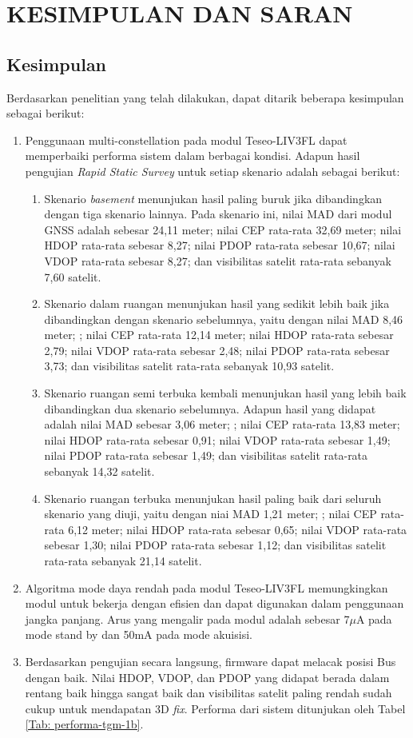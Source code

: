 \chapter{KESIMPULAN DAN SARAN}

\section{Kesimpulan}
Berdasarkan penelitian yang telah dilakukan, dapat ditarik beberapa kesimpulan sebagai berikut:
\begin{enumerate}
	\item Penggunaan multi-constellation pada modul Teseo-LIV3FL dapat memperbaiki performa sistem dalam berbagai kondisi. Adapun hasil pengujian \textit{Rapid Static Survey} untuk setiap skenario adalah sebagai berikut:
	\begin{enumerate}
		\item Skenario \textit{basement} menunjukan hasil paling buruk jika dibandingkan dengan tiga skenario lainnya. Pada skenario ini, nilai MAD dari modul GNSS adalah sebesar 24,11 meter; nilai CEP rata-rata 32,69 meter; nilai HDOP rata-rata sebesar 8,27; nilai PDOP rata-rata sebesar 10,67; nilai VDOP rata-rata sebesar 8,27; dan visibilitas satelit rata-rata sebanyak 7,60 satelit.
		\item Skenario dalam ruangan menunjukan hasil yang sedikit lebih baik jika dibandingkan dengan skenario sebelumnya, yaitu dengan nilai MAD 8,46 meter; ; nilai CEP rata-rata 12,14 meter; nilai HDOP rata-rata sebesar 2,79; nilai VDOP rata-rata sebesar 2,48; nilai PDOP rata-rata sebesar 3,73; dan visibilitas satelit rata-rata sebanyak 10,93 satelit.
		\item Skenario ruangan semi terbuka kembali menunjukan hasil yang lebih baik dibandingkan dua skenario sebelumnya. Adapun hasil yang didapat adalah nilai MAD sebesar 3,06 meter; ; nilai CEP rata-rata 13,83 meter; nilai HDOP rata-rata sebesar 0,91; nilai VDOP rata-rata sebesar 1,49; nilai PDOP rata-rata sebesar 1,49; dan visibilitas satelit rata-rata sebanyak 14,32 satelit.
		\item Skenario ruangan terbuka menunjukan hasil paling baik dari seluruh skenario yang diuji, yaitu dengan niai MAD 1,21 meter; ; nilai CEP rata-rata 6,12 meter; nilai HDOP rata-rata sebesar 0,65; nilai VDOP rata-rata sebesar 1,30; nilai PDOP rata-rata sebesar 1,12; dan visibilitas satelit rata-rata sebanyak 21,14 satelit.
	\end{enumerate}
	\item Algoritma mode daya rendah pada modul Teseo-LIV3FL memungkingkan modul untuk bekerja dengan efisien dan dapat digunakan dalam penggunaan jangka panjang. Arus yang mengalir pada modul adalah sebesar 7$\mu$A pada mode stand by dan 50mA pada mode akuisisi.
	\item Berdasarkan pengujian secara langsung, firmware dapat melacak posisi Bus dengan baik. Nilai HDOP, VDOP, dan PDOP yang didapat berada dalam rentang baik hingga sangat baik dan visibilitas satelit paling rendah sudah cukup untuk mendapatan 3D \textit{fix}.  Performa dari sistem ditunjukan oleh Tabel \ref{Tab: performa-tgm-1b}.
	

\end{enumerate}
